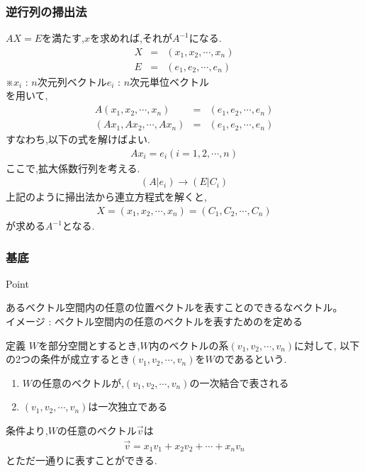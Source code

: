 \documentclass[a4paper]{jsarticle}
\begin{document}
\subsubsection{逆行列の掃出法}
$AX=E$\quad を満たす,$x$を求めれば,それが$A^{-1}$になる.
\begin{eqnarray*}
    X&=&\left(x_1,x_2,\cdots,x_n\right)\\
    E&=&\left(e_1,e_2,\cdots,e_n\right)
\end{eqnarray*}
※$x_i$ : $n$次元列ベクトル\quad $e_i$ : $n$次元単位ベクトル\\
を用いて,
\begin{eqnarray*}
    A\left(x_1,x_2,\cdots,x_n\right)&=&\left(e_1,e_2,\cdots,e_n\right)\\
    \left(Ax_1,Ax_2,\cdots,Ax_n\right)&=&\left(e_1,e_2,\cdots,e_n\right)
\end{eqnarray*}
すなわち,以下の式を解けばよい.
\begin{eqnarray*}
    Ax_i=e_i \left(i=1,2,\cdots,n\right)
\end{eqnarray*}
ここで,拡大係数行列を考える.
\begin{eqnarray*}
    \left(A|e_i\right) \rightarrow \left(E|C_i\right)
\end{eqnarray*}
上記のように掃出法から連立方程式を解くと,
\begin{eqnarray*}
    X=\left(x_1,x_2,\cdots,x_n\right)=\left(C_1,C_2,\cdots,C_n\right)
\end{eqnarray*}
が求める$A^{-1}$となる.
\subsubsection{基底}
\begin{itembox}[l]{Point}
    \begin{center}
        あるベクトル空間内の任意の位置ベクトルを表すことのできるなベクトル。\\
        イメージ : ベクトル空間内の任意のベクトルを表すためのを定める
    \end{center}
\end{itembox}
\begin{itembox}[l]{定義}
    $W$を部分空間とするとき,$W$内のベクトルの系$\left(v_1,v_2,\cdots,v_n\right)$に対して,
    以下の2つの条件が成立するとき$\left(v_1,v_2,\cdots,v_n\right)$を$W$のであるという.
    \begin{enumerate}[(1)]
        \item $W$の任意のベクトルが,$\left(v_1,v_2,\cdots,v_n\right)$の一次結合で表される
        \item $\left(v_1,v_2,\cdots,v_n\right)$は一次独立である
    \end{enumerate}
\end{itembox}
条件より,$W$の任意のベクトル$\vec{v}$は
\begin{eqnarray*}
    \vec{v}=x_1v_1+x_2v_2+\cdots+x_nv_n
\end{eqnarray*}
とただ一通りに表すことができる.
\end{document}
